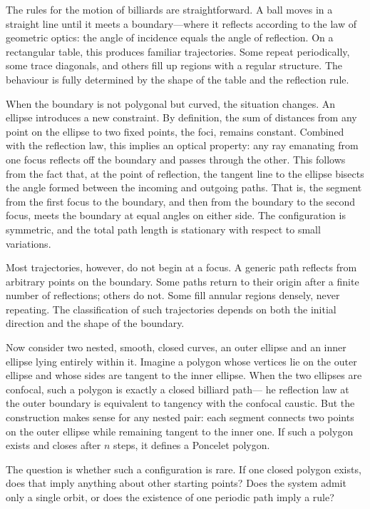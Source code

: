 The rules for the motion of billiards are straightforward. A ball moves in a straight line until it meets a boundary—where it reflects according to the law of geometric optics: the angle of incidence equals the angle of reflection. On a rectangular table, this produces familiar trajectories. Some repeat periodically, some trace diagonals, and others fill up regions with a regular structure. The behaviour is fully determined by the shape of the table and the reflection rule.

When the boundary is not polygonal but curved, the situation changes. An ellipse introduces a new constraint. By definition, the sum of distances from any point on the ellipse to two fixed points, the foci, remains constant. Combined with the reflection law, this implies an optical property: any ray emanating from one focus reflects off the boundary and passes through the other. This follows from the fact that, at the point of reflection, the tangent line to the ellipse bisects the angle formed between the incoming and outgoing paths. That is, the segment from the first focus to the boundary, and then from the boundary to the second focus, meets the boundary at equal angles on either side. The configuration is symmetric, and the total path length is stationary with respect to small variations.

Most trajectories, however, do not begin at a focus. A generic path reflects from arbitrary points on the boundary. Some paths return to their origin after a finite number of reflections; others do not. Some fill annular regions densely, never repeating. The classification of such trajectories depends on both the initial direction and the shape of the boundary.

Now consider two nested, smooth, closed curves, an outer ellipse and an inner ellipse lying entirely within it. Imagine a polygon whose vertices lie on the outer ellipse and whose sides are tangent to the inner ellipse. When the two ellipses are confocal, such a polygon is exactly a closed billiard path— he reflection law at the outer boundary is equivalent to tangency with the confocal caustic. But the construction makes sense for any nested pair: each segment connects two points on the outer ellipse while remaining tangent to the inner one. If such a polygon exists and closes after $n$ steps, it defines a Poncelet polygon.

The question is whether such a configuration is rare. If one closed polygon exists, does that imply anything about other starting points? Does the system admit only a single orbit, or does the existence of one periodic path imply a rule?

